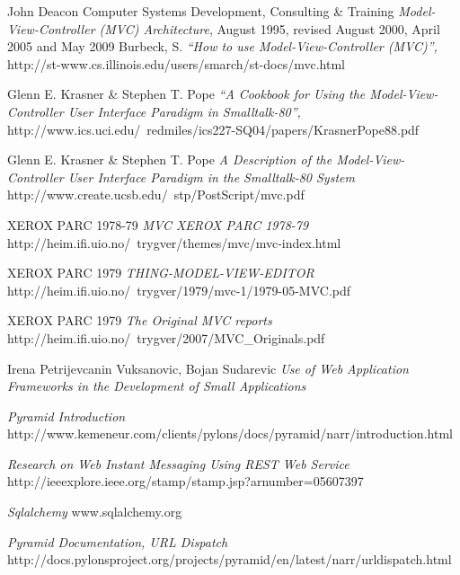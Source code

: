 \documentclass[finnish,utf8,nonumbib,palatino,kandi]{gradu2}
\begin{document}
\begin{thebibliography}{9} %
    John Deacon Computer Systems Development, Consulting \& Training
    \emph{Model-View-Controller (MVC) Architecture},
    August 1995, revised August 2000, April 2005 and May 2009
   Burbeck, S.
  \emph{“How to use Model-View-Controller (MVC)”,}
  http://st-www.cs.illinois.edu/users/smarch/st-docs/mvc.html
 
   Glenn E. Krasner \& Stephen T. Pope
  \emph{“A Cookbook for Using the Model-View-Controller User Interface Paradigm in Smalltalk-80”,}
http://www.ics.uci.edu/~redmiles/ics227-SQ04/papers/KrasnerPope88.pdf

   Glenn E. Krasner \& Stephen T. Pope
  \emph{A Description of the Model-View-Controller User Interface Paradigm in the Smalltalk-80 System}
   http://www.create.ucsb.edu/~stp/PostScript/mvc.pdf

  XEROX PARC 1978-79
  \emph{MVC XEROX PARC 1978-79}
http://heim.ifi.uio.no/~trygver/themes/mvc/mvc-index.html

  XEROX PARC 1979
  \emph{THING-MODEL-VIEW-EDITOR}
   http://heim.ifi.uio.no/~trygver/1979/mvc-1/1979-05-MVC.pdf

  XEROX PARC 1979
  \emph{The Original MVC reports}
 http://heim.ifi.uio.no/~trygver/2007/MVC\_Originals.pdf

Irena Petrijevcanin Vuksanovic, Bojan Sudarevic
  \emph{Use of Web Application Frameworks in the Development of Small Applications}


  \emph{Pyramid Introduction}
   http://www.kemeneur.com/clients/pylons/docs/pyramid/narr/introduction.html

\emph{Research on Web Instant Messaging Using REST Web Service}
http://ieeexplore.ieee.org/stamp/stamp.jsp?arnumber=05607397

\emph{Sqlalchemy}
www.sqlalchemy.org

\emph{Pyramid Documentation, URL Dispatch}
http://docs.pylonsproject.org/projects/pyramid/en/latest/narr/urldispatch.html

\end{thebibliography}
\end{document}
